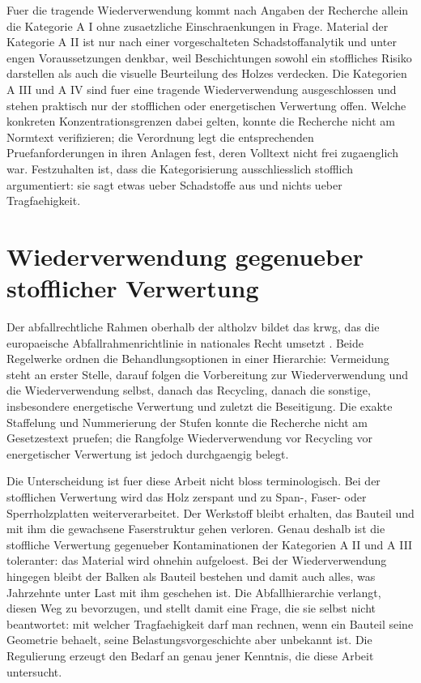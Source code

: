 Fuer die tragende Wiederverwendung kommt nach Angaben der Recherche allein die
Kategorie A I ohne zusaetzliche Einschraenkungen in Frage. Material der
Kategorie A II ist nur nach einer vorgeschalteten Schadstoffanalytik und unter
engen Voraussetzungen denkbar, weil Beschichtungen sowohl ein stoffliches
Risiko darstellen als auch die visuelle Beurteilung des Holzes verdecken. Die
Kategorien A III und A IV sind fuer eine tragende Wiederverwendung
ausgeschlossen und stehen praktisch nur der stofflichen oder energetischen
Verwertung offen. Welche konkreten Konzentrationsgrenzen dabei gelten,
konnte die Recherche nicht am Normtext verifizieren; die Verordnung legt die
entsprechenden Pruefanforderungen in ihren Anlagen fest, deren Volltext nicht
frei zugaenglich war. Festzuhalten ist, dass die Kategorisierung ausschliesslich stofflich
argumentiert: sie sagt etwas ueber Schadstoffe aus und nichts ueber
Tragfaehigkeit.

\section{Wiederverwendung gegenueber stofflicher Verwertung}
\label{sec:hierarchie}

Der abfallrechtliche Rahmen oberhalb der \acrshort{altholzv} bildet das
\acrfull{krwg}, das die europaeische Abfallrahmenrichtlinie in nationales
Recht umsetzt \parencite{krwg,eu2008waste}. Beide Regelwerke ordnen die
Behandlungsoptionen in einer Hierarchie: Vermeidung steht an erster Stelle,
darauf folgen die Vorbereitung zur Wiederverwendung und die Wiederverwendung
selbst, danach das Recycling, danach die sonstige, insbesondere energetische
Verwertung und zuletzt die Beseitigung. Die exakte Staffelung und Nummerierung der Stufen konnte die Recherche nicht am Gesetzestext pruefen; die Rangfolge
Wiederverwendung vor Recycling vor energetischer Verwertung ist jedoch
durchgaengig belegt.

Die Unterscheidung ist fuer diese Arbeit nicht bloss terminologisch. Bei der
stofflichen Verwertung wird das Holz zerspant und zu Span-, Faser- oder
Sperrholzplatten weiterverarbeitet. Der Werkstoff bleibt erhalten, das Bauteil
und mit ihm die gewachsene Faserstruktur gehen verloren. Genau deshalb ist die
stoffliche Verwertung gegenueber Kontaminationen der Kategorien A II und A III
toleranter: das Material wird ohnehin aufgeloest. Bei der Wiederverwendung
hingegen bleibt der Balken als Bauteil bestehen und damit auch alles, was
Jahrzehnte unter Last mit ihm geschehen ist. Die Abfallhierarchie verlangt,
diesen Weg zu bevorzugen, und stellt damit eine Frage, die sie selbst nicht
beantwortet: mit welcher Tragfaehigkeit darf man rechnen, wenn ein Bauteil
seine Geometrie behaelt, seine Belastungsvorgeschichte aber unbekannt ist. Die
Regulierung erzeugt den Bedarf an genau jener Kenntnis, die diese Arbeit
untersucht.

